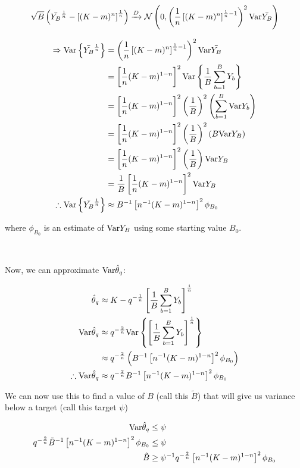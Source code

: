 \[
\sqrt{B} \left( \bar{Y_B}^\frac{1}{n} - \left[(K - m)^n \right]^{\frac{1}{n}} \right)  \xrightarrow{D} \mathcal{N} \left(0, \left( \frac{1}{n} \left[(K - m)^n \right]^{\frac{1}{n} - 1} \right)^2 \mathrm{Var}{\bar{Y_B}} \right)
\]

\begin{align*}
    \Rightarrow \mathrm{Var} \left\{\bar{Y_B}^\frac{1}{n} \right\} &= \left( \frac{1}{n} \left[(K - m)^n \right]^{\frac{1}{n} - 1} \right)^2 \mathrm{Var}{\bar{Y_B}}  \\
        &= \left[ \frac{1}{n} (K - m)^{1-n} \right]^2 \mathrm{Var} \left\{ \frac{1}{B} \sum_{b=1}^B Y_b \right\}  \\
        &= \left[ \frac{1}{n} (K - m)^{1-n} \right]^2 \left(\frac{1}{B} \right)^2 \left( \sum_{b=1}^B \mathrm{Var} Y_b \right)  \\
        &= \left[ \frac{1}{n} (K - m)^{1-n} \right]^2 \left(\frac{1}{B} \right)^2 \left( B \mathrm{Var} Y_B \right) \\
        &= \left[ \frac{1}{n} (K - m)^{1-n} \right]^2 \left(\frac{1}{B} \right) \mathrm{Var} Y_B \\
        &= \frac{1}{B} \left[ \frac{1}{n} (K - m)^{1-n} \right]^2 \mathrm{Var} Y_B \\
        \therefore \mathrm{Var} \left\{\bar{Y_B}^\frac{1}{n} \right\} &\approx B^{-1} \left[ n^{-1} (K - m)^{1 - n} \right]^2 \phi_{B_0}
\end{align*}

where $\phi_{B_0}$ is an estimate of $\mathrm{Var}{Y_B}$ using some starting value $B_0$.

\

Now, we can approximate $\mathrm{Var}\hat{\theta}_q$:

\begin{align*}
    \hat{\theta}_q &\approx K - q^{-\frac{1}{n}} \left[\frac{1}{B}\sum_{b=1}^B Y_b \right]^\frac{1}{n} \\
    \mathrm{Var}\hat{\theta}_q &\approx q^{-\frac{2}{n}} \mathrm{Var} \left\{ \left[\frac{1}{B}\sum_{b=1}^B Y_b \right]^\frac{1}{n} \right\} \\
    &\approx q^{-\frac{2}{n}} \left(B^{-1} \left[ n^{-1} (K - m)^{1 - n} \right]^2 \phi_{B_0} \right) \\
    \therefore \mathrm{Var}\hat{\theta}_q &\approx q^{-\frac{2}{n}} B^{-1} \left[ n^{-1} (K - m)^{1 - n} \right]^2 \phi_{B_0}
\end{align*}

We can now use this to find a value of $B$ (call this $\tilde{B}$) that will give us variance below a target (call this target $\psi$)

\begin{align*}
    \mathrm{Var}\hat{\theta}_q &\leq \psi \\
    q^{-\frac{2}{n}} \tilde{B}^{-1} \left[ n^{-1} (K - m)^{1 - n} \right]^2 \phi_{B_0} &\leq \psi \\
    \tilde{B} &\geq \psi^{-1}q^{-\frac{2}{n}} \left[ n^{-1} (K - m)^{1 - n} \right]^2 \phi_{B_0} \\
\end{align*}